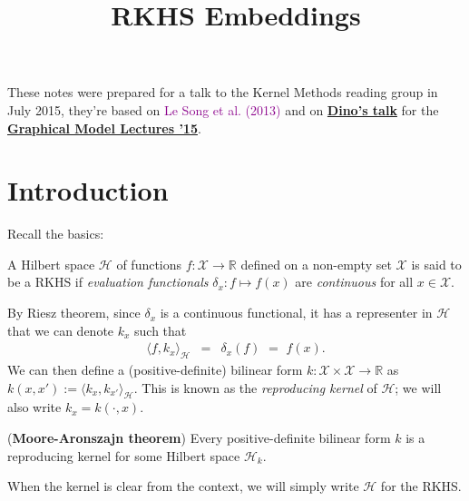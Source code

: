 


\title{RKHS Embeddings}
\author{}
\newcommand{\ctext}[1]{\textcolor{DarkMagenta}{#1}}

\maketitle

\newcommand{\E}{\mathbb E}
\newcommand{\eqa}[1]{\begin{eqnarray}#1\end{eqnarray}}
\newcommand{\scal}[1]{\left\langle#1\right\rangle}
\newcommand{\Id}{\mathbf I}

These notes were prepared for a talk to the Kernel Methods reading group in July 2015, they're based on \ctext{Le Song et al. (2013)} and on \href{http://www.stats.ox.ac.uk/~lienart/gml15_rkhsembeddings.html}{\textbf{Dino's talk}} for the \href{http://www.stats.ox.ac.uk/~lienart/gml.html}{\textbf{Graphical Model Lectures '15}}.

\section*{Introduction}
Recall the basics:

A Hilbert space $\mathcal H$ of functions $f:\mathcal X\to \mathbb R$ defined on a non-empty set $\mathcal X$ is said to be a RKHS if \emph{evaluation functionals} $\delta_x:f\mapsto f(x)$ are \emph{continuous} for all $x\in \mathcal X$.

By Riesz theorem, since $\delta_x$ is a continuous functional, it has a representer in $\mathcal H$ that we can denote $k_x$ such that
\begin{eqnarray}
	\langle f, k_x \rangle_{\mathcal H} &=& \delta_x(f)  \,\,=\,\,f(x).
\end{eqnarray}
We can then define a (positive-definite) bilinear form $k:\mathcal X\times\mathcal X\to\mathbb R$ as $k(x,x'):=\langle k_x,k_{x'}\rangle_{\mathcal H}$. This is known as the \emph{reproducing kernel} of $\mathcal H$; we will also write $k_x=k(\cdot,x)$.

\begin{ybox}
	(\textbf{Moore-Aronszajn theorem}) Every positive-definite bilinear form $k$ is a reproducing kernel for some Hilbert space $\mathcal H_k$.
\end{ybox}
When the kernel is clear from the context, we will simply write $\mathcal H$ for the RKHS.


